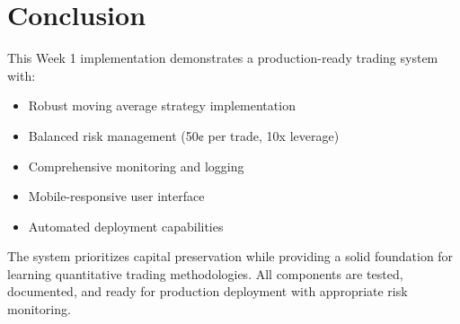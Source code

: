 \documentclass[12pt,a4paper]{article}
\begin{document}
\section{Conclusion}

This Week 1 implementation demonstrates a production-ready trading system with:

\begin{itemize}
\item Robust moving average strategy implementation
\item Balanced risk management (50¢ per trade, 10x leverage)
\item Comprehensive monitoring and logging
\item Mobile-responsive user interface
\item Automated deployment capabilities
\end{itemize}

The system prioritizes capital preservation while providing a solid foundation for learning quantitative trading methodologies. All components are tested, documented, and ready for production deployment with appropriate risk monitoring.
\end{document}
